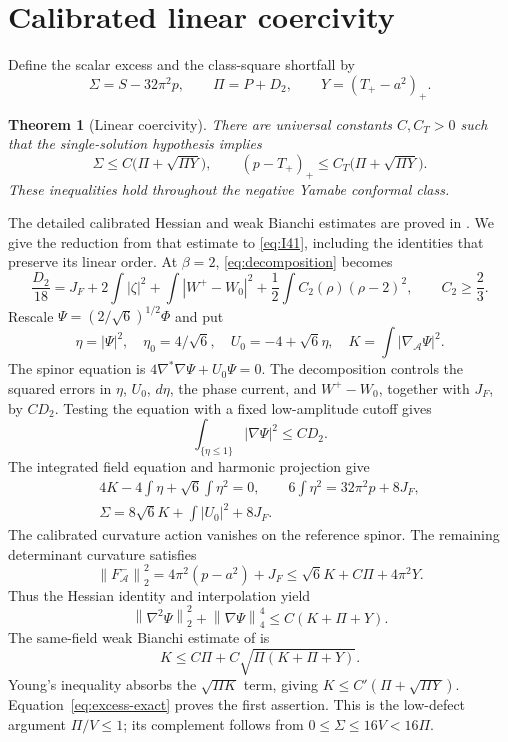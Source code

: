 \documentclass[11pt,a4paper]{article}
\newtheorem{theorem}{Theorem}[section]
\theoremstyle{definition}
\theoremstyle{remark}
\newcommand{\Acal}{\mathcal A}
\newcommand{\norm}[1]{\left\lVert#1\right\rVert}
\begin{document}
\section{Calibrated linear coercivity}
Define the scalar excess and the class-square shortfall by
\begin{equation}
 \Sigma=S-32\pi^2p,\qquad \Pi=P+D_2,\qquad Y=(T_+-a^2)_+.
 \label{eq:I41notation}
\end{equation}
\begin{theorem}[Linear coercivity]\label{thm:I41}
There are universal constants $C,C_T>0$ such that the single-solution hypothesis implies
\begin{equation}
 \Sigma\le C\bigl(\Pi+\sqrt{\Pi Y}\bigr),\qquad
 (p-T_+)_+\le C_T\bigl(\Pi+\sqrt{\Pi Y}\bigr).
 \label{eq:I41}
\end{equation}
These inequalities hold throughout the negative Yamabe conformal class.
\end{theorem}

The detailed calibrated Hessian and weak Bianchi estimates are proved in \cite{Linear,SingleLinear}. We give the reduction from that estimate to \eqref{eq:I41}, including the identities that preserve its linear order. At $\beta=2$, \eqref{eq:decomposition} becomes
\[
 \frac{D_2}{18}=J_F+2\int|\zeta|^2+\int|W^+-W_0|^2
 +\frac12\int C_2(\rho)(\rho-2)^2,
 \qquad C_2\ge\frac23.
\]
Rescale $\Psi=(2/\sqrt6)^{1/2}\Phi$ and put
\[
 \eta=|\Psi|^2,\quad\eta_0=4/\sqrt6,\quad
 U_0=-4+\sqrt6\eta,\quad K=\int|\nabla_{\Acal}\Psi|^2.
\]
The spinor equation is $4\nabla^*\nabla\Psi+U_0\Psi=0$. The decomposition controls the squared errors in $\eta$, $U_0$, $d\eta$, the phase current, and $W^+-W_0$, together with $J_F$, by $CD_2$. Testing the equation with a fixed low-amplitude cutoff gives
\[
 \int_{\{\eta\le1\}}|\nabla\Psi|^2\le CD_2.
\]
The integrated field equation and harmonic projection give
\begin{gather}
 4K-4\int\eta+\sqrt6\int\eta^2=0,\qquad
 6\int\eta^2=32\pi^2p+8J_F,\nonumber\\
 \Sigma=8\sqrt6K+\int|U_0|^2+8J_F.
 \label{eq:excess-exact}
\end{gather}
The calibrated curvature action vanishes on the reference spinor. The remaining determinant curvature satisfies
\[
 \norm{F^-_{\Acal}}_2^2
 =4\pi^2(p-a^2)+J_F
 \le\sqrt6K+C\Pi+4\pi^2Y.
\]
Thus the Hessian identity and interpolation yield
\[
 \norm{\nabla^2\Psi}_2^2+\norm{\nabla\Psi}_4^4
 \le C(K+\Pi+Y).
\]
The same-field weak Bianchi estimate of \cite{Linear,SingleLinear} is
\begin{equation}
 K\le C\Pi+C\sqrt{\Pi(K+\Pi+Y)}.
 \label{eq:Kcoercivity}
\end{equation}
Young's inequality absorbs the $\sqrt{\Pi K}$ term, giving
$K\le C'(\Pi+\sqrt{\Pi Y})$. Equation~\eqref{eq:excess-exact} proves the first assertion. This is the low-defect argument $\Pi/V\le1$; its complement follows from $0\le\Sigma\le16V<16\Pi$.
\end{document}
